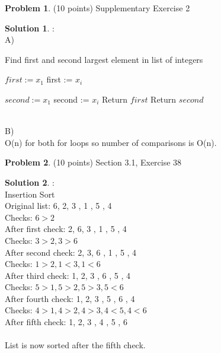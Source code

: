 \documentclass{article}
\theoremstyle{definition}
\newtheorem{problem}{Problem}
\newtheorem*{solution}{Solution}
\begin{document}
\newpage

\begin{problem} (10 points) Supplementary Exercise 2
\end{problem}
\begin{solution}:
\\ A) \\
\begin{algorithm}
\caption{Find first and second largest element in list of integers}
\label{}
\begin{algorithmic}[1]
    \State $first := x_1$
        first := $x_i$
        \EndIf
	\EndFor
	
	\State $second := x_1$
        second := $x_i$
        \EndIf
	\EndFor
	\State Return $first$
	\State Return $second$
\EndProcedure
\end{algorithmic}
\end{algorithm}
\\
B) \\
O(n) for both for loops so number of comparisons is O(n).

\end{solution}

\newpage


\begin{problem} (10 points) Section 3.1, Exercise 38
\end{problem}
\begin{solution}:
\\
Insertion Sort
\\
Original list: 6,  2,  3 , 1 , 5 , 4
\\
Checks: $ 6 > 2$
\\
After first check: 2,  6,  3 , 1 , 5 , 4
\\
Checks: $ 3 > 2, 3 > 6$
\\
After second check:  2,  3,  6 , 1 , 5 , 4
\\ 
Checks: $1 > 2, 1 <  3, 1 < 6$
\\
After third check: 1,  2,  3 , 6 , 5 , 4
\\
Checks: $5 > 1, 5 > 2, 5 > 3, 5 < 6$
\\
After fourth check: 1,  2,  3 , 5 , 6 , 4
\\
Checks: $4 > 1, 4 > 2, 4 > 3, 4 < 5, 4 < 6 $
\\
After fifth check: 1,  2,  3 , 4 , 5 , 6
\\ 
\\
List is now sorted after the fifth check.
\end{solution}
\end{document}

